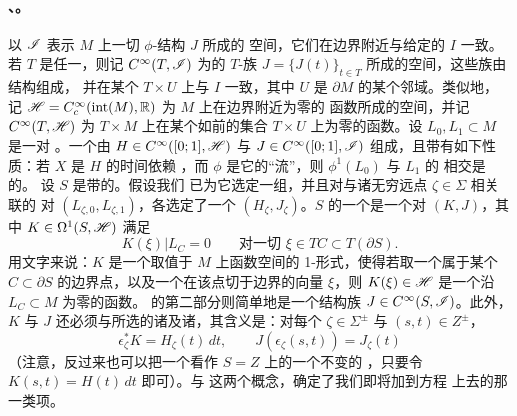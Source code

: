 \paragraph{\trFloerDatum、\trPerturbationDatum。}\label{sub:floer-perturbation-data}
以 $\mathscr{I}$ 表示 $M$ 上一切 $\phi$-\trCompatible\trAlmostComplex{}结构 $J$ 所成的
空间，它们在边界附近与给定的 $I$ 一致。若 $T$ 是任一\trManifold，则记
$C^\infty(T,\mathscr{I})$ 为\trSmooth{}的 $T$-\trParametrization{}族
$J=\{J(t)\}_{t\in T}$ 所成的空间，这些族由\trAlmostComplex{}结构组成，
并在某个 $T\times U$ 上与 $I$ 一致，其中 $U$ 是 $\partial M$ 的某个邻域。类似地，
记 $\mathscr{H}=C_c^\infty(\mathrm{int}(M),\mathbb{R})$ 为 $M$ 上在边界附近为零的\trSmooth%
{}函数所成的空间，并记 $C^\infty(T,\mathscr{H})$ 为 $T\times M$ 上在某个如前的集合
$T\times U$ 上为零的函数。设 $L_0,L_1\subset M$ 是一对\trExact\trLagrange%
\trSubmanifold。一个\trFloerDatum{}由 $H\in C^\infty([0;1],\mathscr{H})$ 与
$J\in C^\infty([0;1],\mathscr{I})$ 组成，且带有如下性质：若 $X$ 是 $H$ 的时间依赖%
\trHamiltonianVectorField，而 $\phi$ 是它的“流”，则 $\phi^1(L_0)$ 与 $L_1$ 的
相交是\trTransverse{}的。
设 $S$ 是带\trLagrange\trLabel{}的\trPointedBoundary\trRiemann\trSurface。假设我们
已为它选定一组\trStriplikeEnd，并且对与诸无穷远点 $\zeta\in\Sigma$ 相关联的%
\trSubmanifold{}对 $(L_{\zeta,0},L_{\zeta,1})$，各选定了一个\trFloerDatum{}%
$(H_\zeta,J_\zeta)$。$S$
的一个\trPerturbationDatum{}是一个对 $(K,J)$，其中 $K\in\Omega^1(S,\mathscr{H})$ 满足
\begin{equation}\label{eq:k-boundary-condition}
K(\xi)|L_C=0\qquad\text{对一切 }\xi\in TC\subset T(\partial S).
\end{equation}
用文字来说：$K$ 是一个取值于 $M$ 上函数空间的 1-形式，使得若取一个属于某个%
\trConnectedComponent{}$C\subset\partial S$ 的边界点，以及一个在该点切于边界的向量%
$\xi$，则 $K(\xi)\in\mathscr{H}$ 是一个沿 $L_C\subset M$ 为零的函数。\trPerturbationDatum%
{}的第二部分则简单地是一个\trAlmostComplex{}结构族
$J\in C^\infty(S,\mathscr{I})$。此外，$K$ 与 $J$
还必须与所选的诸\trStriplikeEnd{}及诸\trFloerDatum{}\trCompatible，其含义是：对每个
$\zeta\in\Sigma^\pm$ 与 $(s,t)\in Z^\pm$，
\begin{equation}\label{eq:perturbation-compatibility}
\epsilon_\zeta^*K=H_\zeta(t)\,dt,\qquad J(\epsilon_\zeta(s,t))=J_\zeta(t)
\end{equation}
（注意，反过来也可以把一个\trFloerDatum{}看作 $S=Z$ 上的一个\trTranslation{}不变的%
\trPerturbationDatum，只要令 $K(s,t)=H(t)\,dt$ 即可）。\trFloerDatum{}与%
\trPerturbationDatum{}这两个概念，确定了我们即将加到\trPseudoholomorphicMap{}方程
上去的那一类\trInhomogeneous{}项。
